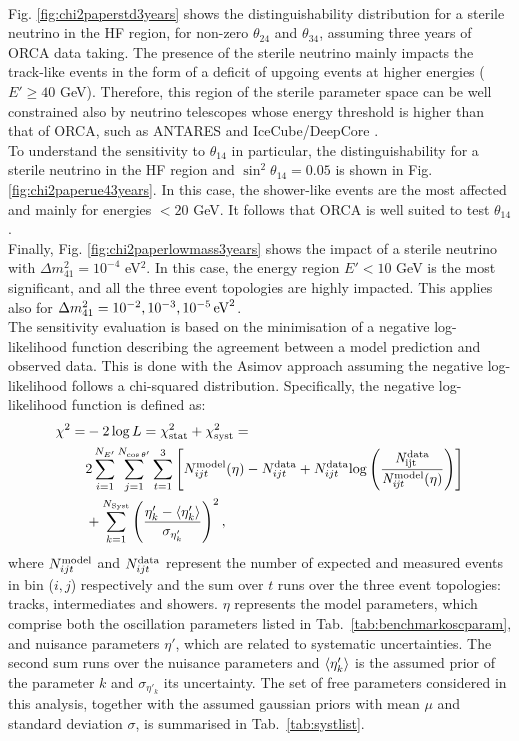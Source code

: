\\
Fig. \ref{fig:chi2paperstd3years} shows the distinguishability distribution for a sterile neutrino in the HF region, for non-zero $\theta_{24}$ and $\theta_{34}$, assuming three years of ORCA data taking. The presence of the sterile neutrino mainly impacts the track-like events in the form of a deficit of upgoing events at higher energies ($E' \geq 40$ GeV). Therefore, this region of the sterile parameter space can be well constrained also by neutrino telescopes whose energy threshold is higher than that of ORCA, such as ANTARES \cite{ANTARES_Sterile} and IceCube/DeepCore \cite{DeepCore_Steriles}.
\\
To understand the sensitivity to $\theta_{14}$ in particular, the distinguishability for a sterile neutrino in the HF region and $\sin^2\theta_{14}=0.05$ is shown in Fig. \ref{fig:chi2paperue43years}. In this case, the shower-like events are the most affected and mainly for energies $< 20$ GeV. It follows that ORCA is well suited to test $\theta_{14}$.
\\
Finally, Fig. \ref{fig:chi2paperlowmass3years} shows the impact of a sterile neutrino with $\Delta m_{41}^2 = 10^{-4}$ eV$^2$. In this case, the energy region $E' < 10$ GeV is the most significant, and all the three event topologies are highly impacted. This applies also for $\Delta m_{41}^2 = 10^{-2}, 10^{-3}, 10^{-5} \, \rm{eV}^2$.
\\
The sensitivity evaluation is based on the minimisation of a negative log-likelihood function describing the agreement between a model prediction and observed data. This is done with the Asimov approach \cite{Asimov} assuming the negative log-likelihood follows a chi-squared distribution. Specifically, the negative log-likelihood function is defined as: 
\begin{equation}
\begin{split}
\chi^2 = & -2 \log L = \chi^2_{\rm stat} + \chi^2_{\rm syst} = \\
& 2 \sum_{i=1}^{N_{E'}} \sum_{j=1}^{N_{\cos \theta'}} \sum_{t=1}^{3} \left[ N_{ijt}^{\rm model}(\eta) - N_{ijt}^{\rm data}
+ N_{ijt}^{\rm data}\rm{log} \left( \frac {\it N_{\rm ijt}^{\rm data}}{\it N_{ijt}^{\rm model}(\eta)} \right) \right] \\
& + \sum_{k=1}^{N_{\rm Syst}} \left( \frac{\eta'_{k} - \braket{\eta'_{k}}}{\sigma_{\eta'_k}} \right)^2 ,
\end{split}
\end{equation}
where $N_{ijt}^{\rm model}$ and $N_{ijt}^{\rm data}$ represent the number of expected and measured events in bin ($i,j$) respectively and the sum over $t$ runs over the three event topologies: tracks, intermediates and showers. $\eta$ represents the model parameters, which comprise both the oscillation parameters listed in Tab.\ \ref{tab:benchmarkoscparam}, and nuisance parameters $\eta'$, which are related to systematic uncertainties. The second sum runs over the nuisance parameters and $\braket{\eta'_{k}}$ is the assumed prior of the parameter $k$ and $\sigma_{\eta'_k}$ its uncertainty. The set of free parameters considered in this analysis, together with the assumed gaussian priors with mean $\mu$ and standard deviation $\sigma$, is summarised in Tab.\ \ref{tab:systlist}. 
